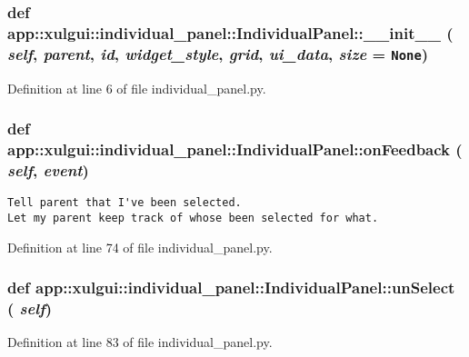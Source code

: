 \subsubsection{\setlength{\rightskip}{0pt plus 5cm}def app::xulgui::individual\_\-panel::IndividualPanel::\_\-\_\-init\_\-\_\- ( {\em self},  {\em parent},  {\em id},  {\em widget\_\-style},  {\em grid},  {\em ui\_\-data},  {\em size} = {\tt None})}\label{classapp_1_1xulgui_1_1individual__panel_1_1IndividualPanel_72d711dbcfd33203bdf2cdad1844c2b6}




Definition at line 6 of file individual\_\-panel.py.
\subsubsection{\setlength{\rightskip}{0pt plus 5cm}def app::xulgui::individual\_\-panel::IndividualPanel::onFeedback ( {\em self},  {\em event})}\label{classapp_1_1xulgui_1_1individual__panel_1_1IndividualPanel_314dc6914e09df111f6cb6b3512e3386}




\footnotesize\begin{verbatim}
Tell parent that I've been selected.
Let my parent keep track of whose been selected for what.
\end{verbatim}
\normalsize
 

Definition at line 74 of file individual\_\-panel.py.
\subsubsection{\setlength{\rightskip}{0pt plus 5cm}def app::xulgui::individual\_\-panel::IndividualPanel::unSelect ( {\em self})}\label{classapp_1_1xulgui_1_1individual__panel_1_1IndividualPanel_16cc37f939ab4b34f70cb0ea417730b0}




Definition at line 83 of file individual\_\-panel.py.
